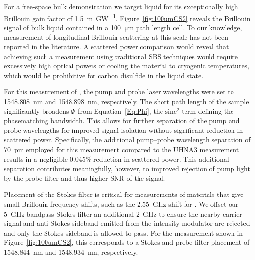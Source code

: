 For a free-space bulk demonstration we target liquid  for its exceptionally high Brillouin gain factor of \SI{1.5}{\meter\per\giga\watt}. \cite{boyd2020nonlinear} Figure~\ref{fig:100umCS2} reveals the Brillouin signal of bulk  liquid contained in a \SI{100}{\micro\meter} path length cell. To our knowledge, measurement of longitudinal Brillouin scattering at this scale has not been reported in the literature. A scattered power comparison would reveal that achieving such a measurement using traditional \ac{SBS} techniques would require excessively high optical powers or cooling the material to cryogenic temperatures, which would be prohibitive for carbon disulfide in the liquid state.

For this measurement of , the pump and probe laser wavelengths were set to \SI{1548.808}{\nano\meter} and \SI{1548.898}{\nano\meter}, respectively. The short path length of the sample significantly broadens \(\Phi\) from Equation~\ref{Eq:Phi}, the \(\mathrm{sinc^2}\) term defining the phasematching bandwidth. This allows for further separation of the pump and probe wavelengths for improved signal isolation without significant reduction in scattered power. Specifically, the additional pump--probe wavelength separation of \SI{70}{\pico\meter} employed for this measurement compared to the UHNA3 measurement results in a negligible 0.045\% reduction in scattered power. This additional separation contributes meaningfully, however, to improved rejection of pump light by the probe filter and thus higher SNR of the signal.

Placement of the Stokes filter is critical for measurements of materials that give small Brillouin frequency shifts, such as the \SI{2.55}{\giga\hertz} shift for . We offset our \SI{5}{\giga\hertz} bandpass Stokes filter an additional \SI{2}{\giga\hertz} to ensure the nearby carrier signal and anti-Stokes sideband emitted from the intensity modulator are rejected and only the Stokes sideband is allowed to pass. For the measurement shown in Figure~\ref{fig:100umCS2}, this corresponds to a Stokes and probe filter placement of \SI{1548.844}{\nano\meter} and \SI{1548.934}{\nano\meter}, respectively.

